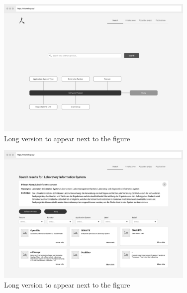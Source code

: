 \begin{figure}
	\centering
    	\includegraphics[width=0.85\textwidth]{Images/Wireframe_Startseite}
   	\caption[Wireframe -- Startseite]{Long version to appear next to the figure}
   	\label{fig:wireframe_start}
\end{figure}

\clearpage

\begin{figure}
	\centering
    	\includegraphics[width=0.85\textwidth]{Images/Wireframe_Ergebnisseite}
   	\caption[Wireframe -- Ergebnisseite]{Long version to appear next to the figure}
   	\label{fig:wireframe_results}
\end{figure}

\clearpage

